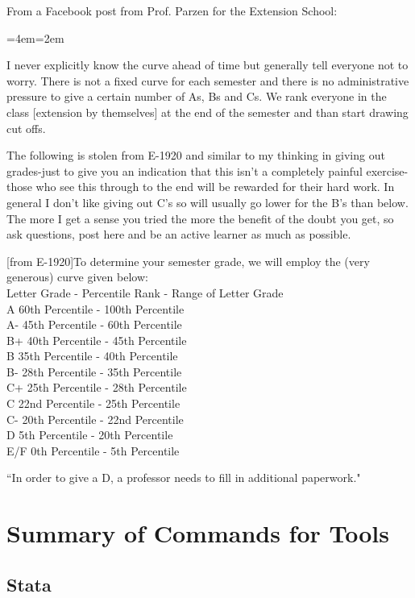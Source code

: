 \documentclass[11pt, oneside]{article}   	%
\newenvironment{blockquote}{%
  \par%
  \medskip
  \leftskip=4em\rightskip=2em%
  \noindent\ignorespaces}{%
  \par\medskip}
\begin{document}
From a Facebook post from Prof. Parzen for the Extension School:
\begin{blockquote}

I never explicitly know the curve ahead of time but generally tell everyone not to worry. There is not a fixed curve for each semester and there is no administrative pressure to give a certain number of As, Bs and Cs. We rank everyone in the class [extension by themselves] at the end of the semester and than start drawing cut offs.

The following is stolen from E-1920 and similar to my thinking in giving out grades-just to give you an indication that this isn't a completely painful exercise-those who see this through to the end will be rewarded for their hard work. In general I don't like giving out C's so will usually go lower for the B's than below. The more I get a sense you tried the more the benefit of the doubt you get, so ask questions, post here and be an active learner as much as possible. 

[from E-1920]To determine your semester grade, we will employ the (very generous) curve given below:\\
Letter Grade - Percentile Rank - Range of Letter Grade\\
A 60th Percentile - 100th Percentile\\
A- 45th Percentile - 60th Percentile\\
B+ 40th Percentile - 45th Percentile\\
B 35th Percentile - 40th Percentile\\
B- 28th Percentile - 35th Percentile\\
C+ 25th Percentile - 28th Percentile\\
C 22nd Percentile - 25th Percentile\\
C- 20th Percentile - 22nd Percentile\\
D 5th Percentile - 20th Percentile\\
E/F 0th Percentile - 5th Percentile\\
\end{blockquote}

``In order to give a D, a professor needs to fill in additional paperwork."

\break
\section{Summary of Commands for Tools}



\subsection{Stata}
\end{document}
